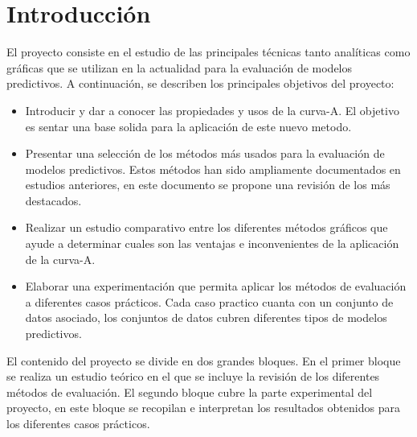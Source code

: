 \section{Introducción}

El proyecto consiste en el estudio de las principales técnicas tanto analíticas como gráficas que se utilizan en la actualidad para la evaluación de modelos predictivos. A continuación, se describen los principales objetivos del proyecto:

\bigbreak

\begin{itemize}
    \item Introducir y dar a conocer las propiedades y usos de la curva-A. El objetivo es sentar una base solida para la aplicación de este nuevo metodo.
    \item Presentar una selección de los métodos más usados para la evaluación de modelos predictivos. Estos métodos han sido ampliamente documentados en estudios anteriores, en este documento se propone una revisión de los más destacados.
    \item Realizar un estudio comparativo entre los diferentes métodos gráficos que ayude a determinar cuales son las ventajas e inconvenientes de la aplicación de la curva-A. 
    \item Elaborar una experimentación que permita aplicar los métodos de evaluación a diferentes casos prácticos. Cada caso practico cuanta con un conjunto de datos asociado, los conjuntos de datos cubren diferentes tipos de modelos predictivos.
\end{itemize}

\bigbreak

El contenido del proyecto se divide en dos grandes bloques. En el primer bloque se realiza un  estudio teórico en el que se incluye la revisión de los diferentes métodos de evaluación. El segundo bloque cubre la parte experimental del proyecto, en este bloque se recopilan e interpretan los resultados obtenidos para los diferentes casos prácticos.

\clearpage